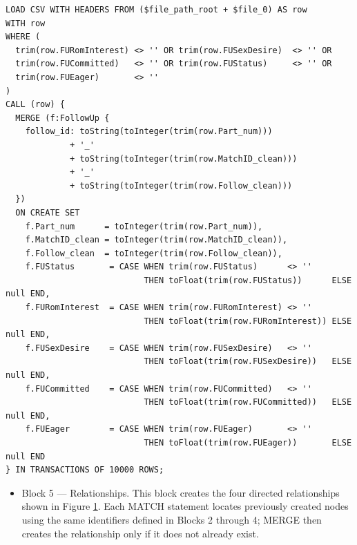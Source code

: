 \documentclass[sn-apa,pdflatex]{sn-jnl}
\theoremstyle{remark}
\theoremstyle{definition}
\providecommand{\tightlist}{%
  \setlength{\itemsep}{0pt}\setlength{\parskip}{0pt}}
\begin{document}
\begin{verbatim}
LOAD CSV WITH HEADERS FROM ($file_path_root + $file_0) AS row
WITH row
WHERE (
  trim(row.FURomInterest) <> '' OR trim(row.FUSexDesire)  <> '' OR
  trim(row.FUCommitted)   <> '' OR trim(row.FUStatus)     <> '' OR
  trim(row.FUEager)       <> ''
)
CALL (row) {
  MERGE (f:FollowUp {
    follow_id: toString(toInteger(trim(row.Part_num)))
             + '_'
             + toString(toInteger(trim(row.MatchID_clean)))
             + '_'
             + toString(toInteger(trim(row.Follow_clean)))
  })
  ON CREATE SET
    f.Part_num      = toInteger(trim(row.Part_num)),
    f.MatchID_clean = toInteger(trim(row.MatchID_clean)),
    f.Follow_clean  = toInteger(trim(row.Follow_clean)),
    f.FUStatus       = CASE WHEN trim(row.FUStatus)      <> ''
                            THEN toFloat(trim(row.FUStatus))      ELSE null END,
    f.FURomInterest  = CASE WHEN trim(row.FURomInterest) <> ''
                            THEN toFloat(trim(row.FURomInterest)) ELSE null END,
    f.FUSexDesire    = CASE WHEN trim(row.FUSexDesire)   <> ''
                            THEN toFloat(trim(row.FUSexDesire))   ELSE null END,
    f.FUCommitted    = CASE WHEN trim(row.FUCommitted)   <> ''
                            THEN toFloat(trim(row.FUCommitted))   ELSE null END,
    f.FUEager        = CASE WHEN trim(row.FUEager)       <> ''
                            THEN toFloat(trim(row.FUEager))       ELSE null END
} IN TRANSACTIONS OF 10000 ROWS;
\end{verbatim}

\begin{itemize}
\tightlist
\item
  Block 5 --- Relationships. This block creates the four directed
  relationships shown in Figure \hyperref[fig:F2]{1}. Each MATCH
  statement locates previously created nodes using the same identifiers
  defined in Blocks 2 through 4; MERGE then creates the relationship
  only if it does not already exist.
\end{itemize}
\end{document}
